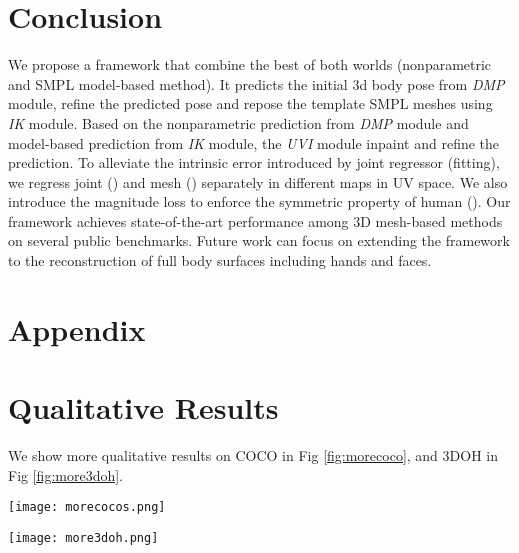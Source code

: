 \documentclass[10pt,twocolumn,letterpaper]{article}
\begin{document}
\section{Conclusion}
We propose a framework that combine the best of both worlds (nonparametric and SMPL model-based method). It predicts the initial 3d body pose from \textit{DMP} module, refine the predicted pose and repose the template SMPL meshes using \textit{IK} module. Based on the nonparametric prediction from \textit{DMP} module and model-based prediction from \textit{IK} module, the \textit{UVI} module inpaint and refine the prediction. To alleviate the intrinsic error introduced by joint regressor (fitting), we regress joint () and mesh () separately in different maps in UV space. We also introduce the magnitude loss  to enforce the symmetric property of human (). Our framework achieves state-of-the-art performance among 3D
mesh-based methods on several public benchmarks. Future work can focus on extending the framework to the reconstruction of full body surfaces including hands and faces. 

{\small


}



\newpage

\appendix
\section*{Appendix}
\section{Qualitative Results}

We show more qualitative results on COCO \cite{lin2014microsoft} in Fig \ref{fig:morecoco}, and 3DOH \cite{3DOH} in Fig \ref{fig:more3doh}.


\begin{figure*}
\centering
\texttt{[image: morecocos.png]}
\caption{{More qualitative results on COCO dataset. (Best viewed in Color) }}
\label{fig:morecoco}
\end{figure*}


\begin{figure*}
\centering
\texttt{[image: more3doh.png]}
\caption{{More qualitative results on 3DOH dataset. (Best viewed in Color) }}
\label{fig:more3doh}
\end{figure*}
\end{document}
